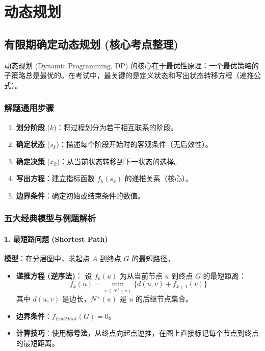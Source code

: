 \documentclass[a4paper,12pt]{ctexart} %
\begin{document}
	\section{动态规划}
	
	\subsection{有限期确定动态规划 (核心考点整理)}
	
	动态规划 (Dynamic Programming, DP) 的核心在于最优性原理：一个最优策略的子策略总是最优的。在考试中，最关键的是定义状态和写出状态转移方程（递推公式）。
	
	\subsubsection{解题通用步骤}
	\begin{enumerate}
		\item \textbf{划分阶段} ($k$)：将过程划分为若干相互联系的阶段。
		\item \textbf{确定状态} ($s_k$)：描述每个阶段开始时的客观条件（无后效性）。
		\item \textbf{确定决策} ($x_k$)：从当前状态转移到下一状态的选择。
		\item \textbf{写出方程}：建立指标函数 $f_k(s_k)$ 的递推关系（核心）。
		\item \textbf{边界条件}：确定初始或结束条件的数值。
	\end{enumerate}
	
	\subsubsection{五大经典模型与例题解析}
	
	\paragraph{1. 最短路问题 (Shortest Path)}
	\textbf{模型}：在分层图中，求起点 $A$ 到终点 $G$ 的最短路径。
	\begin{itemize}
		\item \textbf{递推方程 (逆序法)}：
		设 $f_k(u)$ 为从当前节点 $u$ 到终点 $G$ 的最短距离：
		\[
		f_k(u) = \min_{v \in N^+(u)} \{ d(u,v) + f_{k+1}(v) \}
		\]
		其中 $d(u,v)$ 是边长，$N^+(u)$ 是 $u$ 的后继节点集合。
		\item \textbf{边界条件}：$f_{EndPoint}(G) = 0$。
		\item \textbf{计算技巧}：使用\textbf{标号法}，从终点向起点逆推，在图上直接标记每个节点到终点的最短距离。
	\end{itemize}
	
\end{document}
